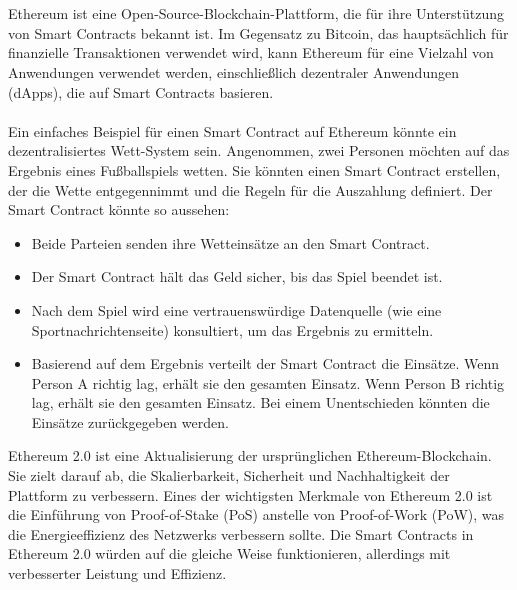 \\\\
Ethereum ist eine Open-Source-Blockchain-Plattform, die für ihre Unterstützung von Smart Contracts bekannt ist. Im Gegensatz zu Bitcoin, das hauptsächlich für finanzielle Transaktionen verwendet wird, kann Ethereum für eine Vielzahl von Anwendungen verwendet werden, einschließlich dezentraler Anwendungen (dApps), die auf Smart Contracts basieren.
\\\\
Ein einfaches Beispiel für einen Smart Contract auf Ethereum könnte ein dezentralisiertes Wett-System sein. Angenommen, zwei Personen möchten auf das Ergebnis eines Fußballspiels wetten. Sie könnten einen Smart Contract erstellen, der die Wette entgegennimmt und die Regeln für die Auszahlung definiert. Der Smart Contract könnte so aussehen:
\begin{itemize}
\item Beide Parteien senden ihre Wetteinsätze an den Smart Contract.
\item Der Smart Contract hält das Geld sicher, bis das Spiel beendet ist.
\item Nach dem Spiel wird eine vertrauenswürdige Datenquelle (wie eine Sportnachrichtenseite) konsultiert, um das Ergebnis zu ermitteln.
\item Basierend auf dem Ergebnis verteilt der Smart Contract die Einsätze. Wenn Person A richtig lag, erhält sie den gesamten Einsatz. Wenn Person B richtig lag, erhält sie den gesamten Einsatz. Bei einem Unentschieden könnten die Einsätze zurückgegeben werden.
\end{itemize}
Ethereum 2.0 ist eine Aktualisierung der ursprünglichen Ethereum-Blockchain. Sie zielt darauf ab, die Skalierbarkeit, Sicherheit und Nachhaltigkeit der Plattform zu verbessern. Eines der wichtigsten Merkmale von Ethereum 2.0 ist die Einführung von Proof-of-Stake (PoS) anstelle von Proof-of-Work (PoW), was die Energieeffizienz des Netzwerks verbessern sollte. Die Smart Contracts in Ethereum 2.0 würden auf die gleiche Weise funktionieren, allerdings mit verbesserter Leistung und Effizienz.

\label{Woche11}

